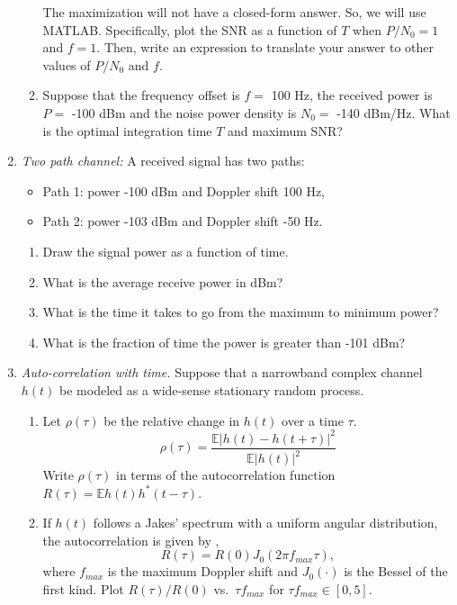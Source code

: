 \documentclass[11pt]{article}
\def\Exp{\mathbb{E}}
\begin{document}
\begin{enumerate}
\begin{enumerate}[label=(\alph*)]
The maximization will not have a closed-form answer.  So, we will use MATLAB.
Specifically, plot the SNR as a function of $T$ when $P/N_0=1$ and $f=1$.  Then,
write an expression to translate your answer to other values of $P/N_0$ and $f$.

\item Suppose that the frequency offset is $f=$ 100 Hz, the received power
is $P=$ -100 dBm and the noise power density is $N_0=$ -140 dBm/Hz.
What is the optimal integration time $T$ and maximum SNR?

\end{enumerate}

\item \emph{Two path channel:}  A received signal has two paths:
\begin{itemize}
\item Path 1:  power -100 dBm and Doppler shift 100 Hz,
\item Path 2:  power -103 dBm and Doppler shift -50 Hz.
\end{itemize}
\begin{enumerate}[label=(\alph*)]
\item Draw the signal power as a function of time.
\item What is the average receive power in dBm?
\item What is the time it takes to go from the maximum to minimum power?
\item What is the fraction of time the power is greater than -101 dBm?
\end{enumerate}

\item \emph{Auto-correlation with time.}   
Suppose that a narrowband complex channel $h(t)$ be modeled as
a wide-sense stationary random process.
\begin{enumerate}[label=(\alph*)]

\item Let $\rho(\tau)$ be the relative change
in $h(t)$ over a time $\tau$.
\[
    \rho(\tau) = \frac{\Exp|h(t)-h(t+\tau)|^2}{\Exp|h(t)|^2}
\]
Write $\rho(\tau)$ in terms of the autocorrelation function
$R(\tau) = \Exp h(t)h^*(t-\tau)$.

\item If $h(t)$ follows a Jakes' spectrum with a uniform angular distribution,
the autocorrelation is given by ,
\[
    R(\tau) = R(0)J_0(2\pi f_{max}\tau),
\]
where $f_{max}$ is the maximum Doppler shift and $J_0(\cdot)$ is the Bessel
of the first kind.  Plot $R(\tau)/R(0)$ vs.\ $\tau f_{max}$ for $\tau f_{max} \in [0,5]$.


\end{enumerate}
\end{enumerate}
\end{document}
